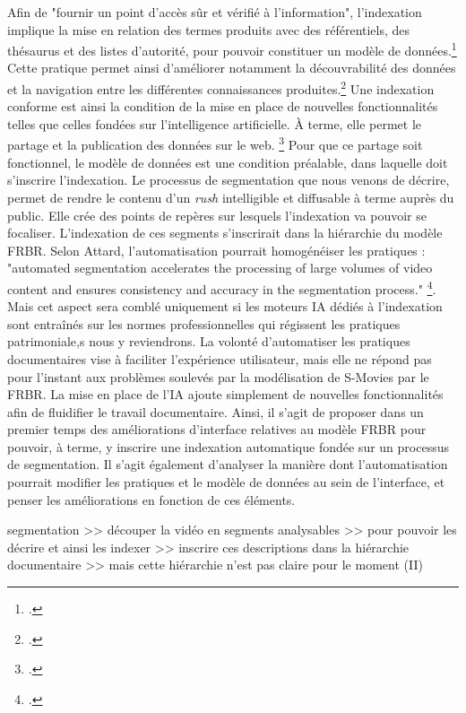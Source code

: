 Afin de "fournir un point d'accès sûr et vérifié à l'information", l'indexation implique la mise en relation des termes produits avec des référentiels, des thésaurus et des listes d'autorité, pour pouvoir constituer un modèle de données.\footcite{zotero-item-675}
Cette pratique permet ainsi d'améliorer notamment la découvrabilité des données et la navigation entre les différentes connaissances produites.\footcite{zotero-item-675} Une indexation conforme est ainsi la condition de la mise en place de nouvelles fonctionnalités telles que celles fondées sur l'intelligence artificielle. À terme, elle permet le partage et la publication des données sur le web. \footcite{zotero-item-675} Pour que ce partage soit fonctionnel, le modèle de données est une condition préalable, dans laquelle doit s'inscrire l'indexation.
Le processus de segmentation que nous venons de décrire, permet de rendre le contenu d'un \textit{rush} intelligible et diffusable à terme auprès du public. Elle crée des points de repères sur lesquels l'indexation va pouvoir se focaliser. L'indexation de ces segments s'inscrirait dans la hiérarchie du modèle FRBR.  
Selon Attard, l'automatisation pourrait homogénéiser les pratiques : "automated segmentation accelerates the processing of large volumes of video content and ensures consistency and accuracy in the segmentation process." \footcite{attard2025}. Mais cet aspect sera comblé uniquement si les moteurs IA dédiés à l'indexation sont entraînés sur les normes professionnelles qui régissent les pratiques patrimoniale,s nous y reviendrons.
La volonté d'automatiser les pratiques documentaires vise à faciliter l'expérience utilisateur, mais elle ne répond pas pour l'instant aux problèmes soulevés par la modélisation de S-Movies par le FRBR. La mise en place de l'IA ajoute simplement de nouvelles fonctionnalités afin de fluidifier le travail documentaire. Ainsi, il s'agit de proposer dans un premier temps des améliorations d'interface relatives au modèle FRBR pour pouvoir, à terme, y inscrire une indexation automatique fondée sur un processus de segmentation. Il s'agit également d'analyser la manière dont l'automatisation pourrait modifier les pratiques et le modèle de données au sein de l'interface, et penser les améliorations en fonction de ces éléments. 



segmentation >> découper la vidéo en segments analysables >> pour pouvoir les décrire et ainsi les indexer >> inscrire ces descriptions dans la hiérarchie documentaire >> mais cette hiérarchie n'est pas claire pour le moment (II)
